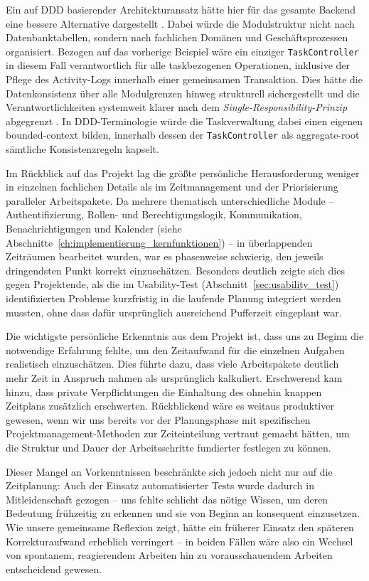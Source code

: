 Ein auf \gls{DDD} basierender Architekturansatz hätte hier für das gesamte Backend eine bessere Alternative dargestellt \cite[S.~68--77]{evans2004domain}. Dabei würde die Modulstruktur nicht nach Datenbanktabellen, sondern nach fachlichen Domänen und Geschäfts\-prozessen organisiert. Bezogen auf das vorherige Beispiel wäre ein einziger \texttt{TaskController} in diesem Fall verantwortlich für alle taskbezogenen Operationen, inklusive der Pflege des Activity-Logs innerhalb einer gemeinsamen Transaktion. Dies hätte die Datenkonsistenz über alle Modulgrenzen hinweg strukturell sichergestellt und die Verantwortlichkeiten systemweit klarer nach dem \textit{Single-Responsibility-Prinzip} abgegrenzt \cite[S.~56--61]{martin2017clean}. In DDD-Terminologie würde die Taskverwaltung dabei einen eigenen \gls{bounded-context} bilden, innerhalb dessen der \texttt{TaskController} als \gls{aggregate-root} sämtliche Konsistenzregeln kapselt.

Im Rückblick auf das Projekt lag die größte persönliche Herausforderung weniger in einzelnen fachlichen Details als im Zeitmanagement und der Priorisierung paralleler Arbeitspakete. Da mehrere thematisch unterschiedliche Module -- Authentifizierung, Rollen- und Berechtigungslogik, Kommunikation, Benachrichtigungen und Kalender (siehe Abschnitte~\ref{ch:implementierung_kernfunktionen}) -- in überlappenden Zeiträumen bearbeitet wurden, war es phasenweise schwierig, den jeweils dringendsten Punkt korrekt einzuschätzen. Besonders deutlich zeigte sich dies gegen Projektende, als die im Usability-Test (Abschnitt~\ref{sec:usability_test}) identifizierten Probleme kurzfristig in die laufende Planung integriert werden mussten, ohne dass dafür ursprünglich ausreichend Pufferzeit eingeplant war.

Die wichtigste persönliche Erkenntnis aus dem Projekt ist, dass uns zu Beginn die notwendige Erfahrung fehlte, um den Zeitaufwand für die einzelnen Aufgaben realistisch einzuschätzen. Dies führte dazu, dass viele Arbeitspakete deutlich mehr Zeit in Anspruch nahmen als ursprünglich kalkuliert. Erschwerend kam hinzu, dass private Verpflichtungen die Einhaltung des ohnehin knappen Zeitplans zusätzlich erschwerten. Rückblickend wäre es weitaus produktiver gewesen, wenn wir uns bereits vor der Planungsphase mit spezifischen Projektmanagement-Methoden zur Zeiteinteilung vertraut gemacht hätten, um die Struktur und Dauer der Arbeitsschritte fundierter festlegen zu können.

Dieser Mangel an Vorkenntnissen beschränkte sich jedoch nicht nur auf die Zeitplanung: Auch der Einsatz automatisierter Tests wurde dadurch in Mitleidenschaft gezogen – uns fehlte schlicht das nötige Wissen, um deren Bedeutung frühzeitig zu erkennen und sie von Beginn an konsequent einzusetzen. Wie unsere gemeinsame Reflexion zeigt, hätte ein früherer Einsatz den späteren Korrekturaufwand erheblich verringert – in beiden Fällen wäre also ein Wechsel von spontanem, reagierendem Arbeiten hin zu vorausschauendem Arbeiten entscheidend gewesen.

